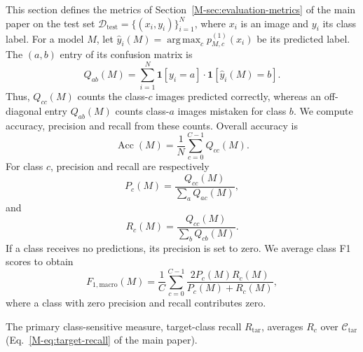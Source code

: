 \documentclass[10pt,journal,compsoc]{IEEEtran}
\theoremstyle{definition}
\DeclareMathOperator*{\argmax}{arg\,max}
\begin{document}
This section defines the metrics of Section~\ref{M-sec:evaluation-metrics}
of the main paper on the test set
$\mathcal{D}_{\mathrm{test}}=\{(x_i,y_i)\}_{i=1}^{N}$, where $x_i$ is
an image and $y_i$ its class label. For a model $M$, let
$\widehat y_i(M)=\argmax_c p_{M,c}^{(1)}(x_i)$ be its predicted label.
The $(a,b)$ entry of its confusion matrix is
\begin{equation}
\label{eq:confusion-entry}
Q_{ab}(M)=\sum_{i=1}^{N}
\mathbf{1}[y_i=a]\cdot\mathbf{1}[\widehat y_i(M)=b].
\end{equation}
Thus, $Q_{cc}(M)$ counts the class-$c$ images predicted correctly,
whereas an off-diagonal entry $Q_{ab}(M)$ counts class-$a$ images
mistaken for class $b$. We compute accuracy, precision
and recall from these counts. Overall accuracy is
\begin{equation}
\label{eq:overall-accuracy}
\operatorname{Acc}(M)=\frac{1}{N}\sum_{c=0}^{C-1}Q_{cc}(M).
\end{equation}
For class $c$, precision and recall are respectively
\begin{equation}
\label{eq:class-precision}
P_c(M)=\frac{Q_{cc}(M)}{\sum_a Q_{ac}(M)},
\end{equation}
and
\begin{equation}
\label{eq:class-recall}
R_c(M)=\frac{Q_{cc}(M)}{\sum_b Q_{cb}(M)}.
\end{equation}
If a class receives no predictions, its precision is set to zero.
We average class F1 scores to obtain
\begin{equation}
\label{eq:macro-f1}
F_{1,\mathrm{macro}}(M)=\frac{1}{C}
\sum_{c=0}^{C-1}\frac{2P_c(M)R_c(M)}{P_c(M)+R_c(M)},
\end{equation}
where a class with zero precision and recall contributes zero.

The primary class-sensitive measure, target-class recall
$R_{\mathrm{tar}}$, averages $R_c$ over $\mathcal C_{\mathrm{tar}}$
(Eq.~\eqref{M-eq:target-recall} of the main paper).
\end{document}
